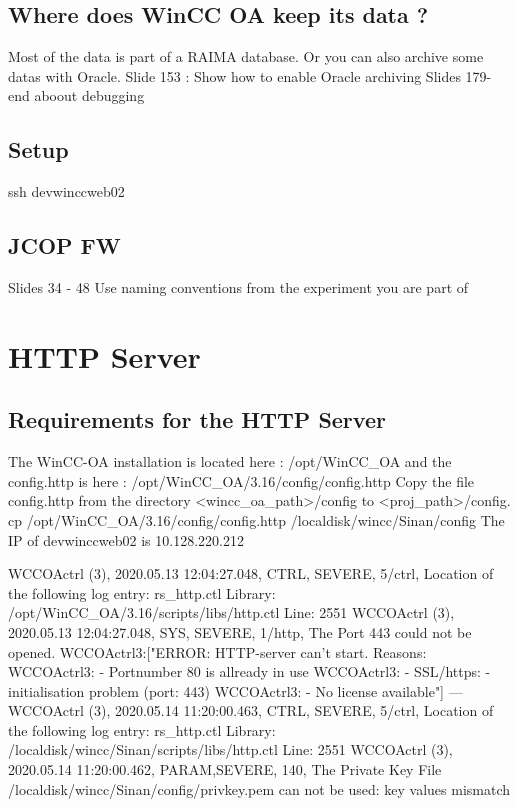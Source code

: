 \documentclass[a4paper, 10pt]{article}
\begin{document}
\subsection{Where does WinCC OA keep its data ?}
Most of the data is part of a RAIMA database. Or you can also archive some datas with Oracle.
Slide 153 : Show how to enable Oracle archiving
Slides 179-end aboout debugging

\subsection*{Setup}
ssh devwinccweb02

\subsection*{JCOP FW}
Slides 34 - 48
Use naming conventions from the experiment you are part of

\newpage
\section*{HTTP Server}
\subsection*{Requirements for the HTTP Server}
The WinCC-OA installation is located here : /opt/WinCC\_OA and the config.http is here : /opt/WinCC\_OA/3.16/config/config.http
Copy the file config.http from the directory <wincc\_oa\_path>/config to <proj\_path>/config.
cp /opt/WinCC\_OA/3.16/config/config.http /localdisk/wincc/Sinan/config
The IP of devwinccweb02 is 10.128.220.212


WCCOActrl    (3), 2020.05.13 12:04:27.048, CTRL, SEVERE,      5/ctrl, Location of the following log entry: rs\_http.ctl    Library: /opt/WinCC\_OA/3.16/scripts/libs/http.ctl
Line: 2551
WCCOActrl    (3), 2020.05.13 12:04:27.048, SYS,  SEVERE,      1/http, The Port 443 could not be opened.
WCCOActrl3:["ERROR: HTTP-server can't start. Reasons:
WCCOActrl3: - Portnumber 80 is allready in use
WCCOActrl3: - SSL/https: - initialisation problem (port: 443)
WCCOActrl3: - No license available"]
---
WCCOActrl    (3), 2020.05.14 11:20:00.463, CTRL, SEVERE,      5/ctrl, Location of the following log entry: rs\_http.ctl    Library: /localdisk/wincc/Sinan/scripts/libs/http.ctl
    Line: 2551
WCCOActrl    (3), 2020.05.14 11:20:00.462, PARAM,SEVERE,    140, The Private Key File /localdisk/wincc/Sinan/config/privkey.pem can not be used: key values mismatch
\end{document}
